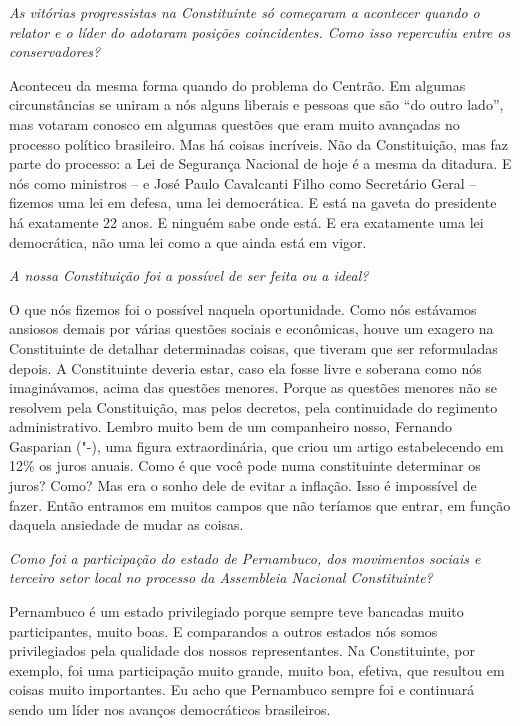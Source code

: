 \medskip

\noindent\emph{As vitórias progressistas na Constituinte só começaram a
acontecer quando o relator e o líder do  adotaram posições
coincidentes. Como isso repercutiu entre os conservadores?}

Aconteceu da mesma forma quando do problema do Centrão.
Em algumas circunstâncias se uniram a nós alguns liberais e pessoas que
são ``do outro lado'', mas votaram conosco em algumas questões que eram
muito avançadas no processo político brasileiro. Mas há coisas
incríveis. Não da Constituição, mas faz parte do processo: a Lei de
Segurança Nacional de hoje é a mesma da ditadura. E nós como ministros
-- e José Paulo Cavalcanti Filho como Secretário Geral -- fizemos uma
lei em defesa, uma lei democrática. E está na gaveta do presidente há
exatamente 22 anos. E ninguém sabe onde está. E era exatamente uma lei
democrática, não uma lei como a que ainda está em vigor.

\medskip

\noindent\emph{A nossa Constituição foi a possível de ser feita ou a ideal?}

O que nós fizemos foi o possível naquela oportunidade.
Como nós estávamos ansiosos demais por várias questões sociais e
econômicas, houve um exagero na Constituinte de detalhar determinadas
coisas, que tiveram que ser reformuladas depois. A Constituinte deveria
estar, caso ela fosse livre e soberana como nós imaginávamos, acima das
questões menores. Porque as questões menores não se resolvem pela
Constituição, mas pelos decretos, pela continuidade do regimento
administrativo. Lembro muito bem de um companheiro nosso, Fernando
Gasparian ("-), uma figura extraordinária, que criou um artigo
estabelecendo em 12\% os juros anuais. Como é que você pode numa
constituinte determinar os juros? Como? Mas era o sonho dele de evitar a
inflação. Isso é impossível de fazer. Então entramos em muitos campos
que não teríamos que entrar, em função daquela ansiedade de mudar as
coisas.

\medskip

\noindent\emph{Como foi a participação do estado de Pernambuco, dos movimentos
sociais e terceiro setor local no processo da Assembleia Nacional
Constituinte?}

Pernambuco é um estado privilegiado porque sempre teve
bancadas muito participantes, muito boas. E comparandos a outros estados
nós somos privilegiados pela qualidade dos nossos representantes. Na
Constituinte, por exemplo, foi uma participação muito grande, muito boa,
efetiva, que resultou em coisas muito importantes. Eu acho que
Pernambuco sempre foi e continuará sendo um líder nos avanços
democráticos brasileiros.

